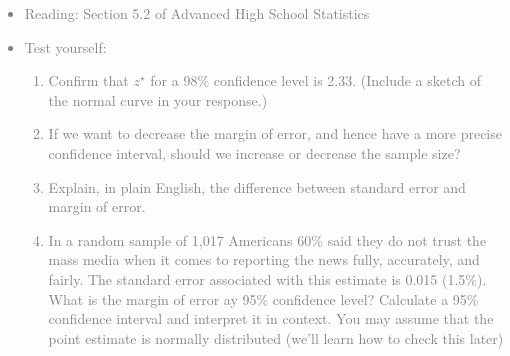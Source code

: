 \documentclass[11pt]{article}
\newcommand{\gray}[1]{\textcolor{gray}{#1}}
\begin{document}
\gray{
{\it
\vspace{-0.5cm}
\begin{itemize}
\renewcommand{\labelitemi}{{\textcolor{dark}{$\ast$}}}
\item Reading: Section 5.2 of Advanced High School Statistics
\item Test yourself: 
{\small
\begin{enumerate}
\item Confirm that $z^{\star}$ for a 98\% confidence level is 2.33. (Include a sketch of the normal curve in your response.)
\item If we want to decrease the margin of error, and hence have a more precise confidence interval, should we increase or decrease the sample size?
\item Explain, in plain English, the difference between standard error and margin of error.
\item In a random sample of 1,017 Americans 60\% said they do not trust the mass media when it comes to reporting the news fully, accurately, and fairly. The standard error associated with this estimate is 0.015 (1.5\%). What is the margin of error ay 95\% confidence level? Calculate a 95\% confidence interval and interpret it in context. You may assume that the point estimate is normally distributed (we'll learn how to check this later)

\end{enumerate}}
\end{itemize}}}
\end{document}
